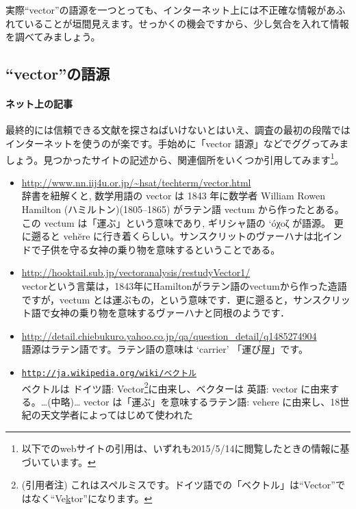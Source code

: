 実際``vector''の語源を一つとっても、インターネット上には不正確な情報があふれていることが垣間見えます。せっかくの機会ですから、少し気合を入れて情報を調べてみましょう。

\subsection{``vector''の語源}

\paragraph{ネット上の記事}

最終的には信頼できる文献を探さねばいけないとはいえ、調査の最初の段階ではインターネットを使うのが楽です。手始めに「vector 語源」などでググってみましょう。見つかったサイトの記述から、関連個所をいくつか引用してみます\footnote{以下でのwebサイトの引用は、いずれも2015/5/14に閲覧したときの情報に基づいています。}。

\begin{itemize}
\item \url{http://www.nn.iij4u.or.jp/~hsat/techterm/vector.html} \\
辞書を紐解くと, 数学用語の vector は 1843 年に数学者 William Rowen Hamilton (ハミルトン)(1805--1865) がラテン語 vectum から作ったとある。この vectum は「運ぶ」という意味であり, ギリシャ語の `\'oχoζ が語源。 更に遡ると veh\u{e}re に行き着くらしい。サンスクリットのヴァーハナは北インドで子供を守る女神の乗り物を意味するということである。
\item \url{ http://hooktail.sub.jp/vectoranalysis/restudyVector1/} \\
vectorという言葉は，1843年にHamiltonがラテン語のvectumから作った造語ですが，vectum とは運ぶもの，という意味です．更に遡ると，サンスクリット語で女神の乗り物を意味するヴァーハナと同根のようです．
\item \url{http://detail.chiebukuro.yahoo.co.jp/qa/question_detail/q1485274904}  \\
語源はラテン語です。ラテン語の意味は `carrier' 「運び屋」です。
\item \href{http://ja.wikipedia.org/wiki/\%E3\%83\%99\%E3\%82\%AF\%E3\%83\%88\%E3\%83\%AB}{\texttt{http://ja.wikipedia.org/wiki/ベクトル}} \\
ベクトルは ドイツ語: Vector\footnote{(引用者注) これはスペルミスです。ドイツ語での「ベクトル」は``Vector''ではなく``Ve\underline{k}tor''になります。}に由来し、ベクターは 英語: vector に由来する。…(中略)… vector は「運ぶ」を意味するラテン語: vehere に由来し、18世紀の天文学者によってはじめて使われた
\end{itemize}

